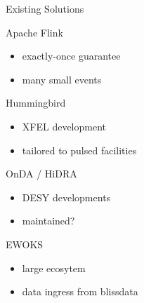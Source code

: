 \documentclass[aspectratio=169]{beamer}
\begin{document}
\begin{frame}{Existing Solutions}
\begin{minipage}[t]{0.49\textwidth}
 \begin{block}{Apache Flink} %
 \begin{itemize}
  \item exactly-once guarantee
  \item many small events
 \end{itemize}
 \end{block}

 \begin{block}{Hummingbird}
  \begin{itemize}
   \item XFEL development
   \item tailored to pulsed facilities
  \end{itemize}
 \end{block}
 \end{minipage}
 \begin{minipage}[t]{0.49\textwidth}
 \begin{block}{OnDA / HiDRA}
  \begin{itemize}
   \item DESY developments
   \item maintained?
  \end{itemize}

 \end{block}
 \begin{block}{EWOKS}
  \begin{itemize}
   \item large ecosytem
   \item data ingress from blissdata
  \end{itemize}

 \end{block}
 \end{minipage}

\end{frame}
\end{document}
